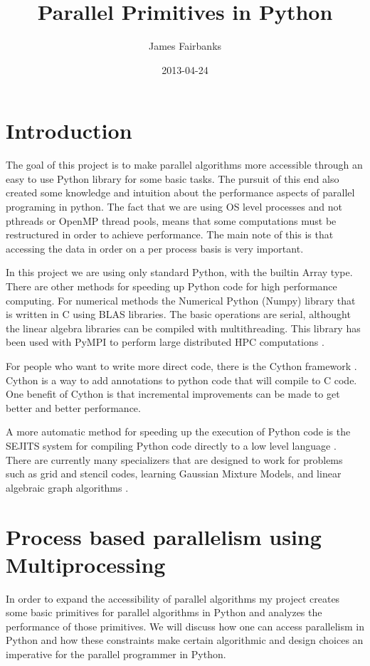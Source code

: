 \documentclass[]{IEEEtran}
\title{Parallel Primitives in Python}
\author{James Fairbanks}
\date{2013-04-24}
\begin{document}
\maketitle

\section{Introduction}

The goal of this project is to make parallel algorithms more accessible
through an easy to use Python library for some basic tasks. The pursuit
of this end also created some knowledge and intuition about the
performance aspects of parallel programing in python. The fact that we
are using OS level processes and not pthreads or OpenMP thread pools,
means that some computations must be restructured in order to achieve
performance. The main note of this is that accessing the data in order
on a per process basis is very important.

In this project we are using only standard Python, with the builtin
Array type. There are other methods for speeding up Python code for high
performance computing. For numerical methods the Numerical Python
(Numpy) library that is written in C using BLAS libraries. The basic
operations are serial, althought the linear algebra libraries can be
compiled with multithreading. This library has been used with PyMPI to
perform large distributed HPC computations \cite{alghamdi2011petclaw}.

For people who want to write more direct code, there is the Cython
framework \cite{cython}. Cython is a way to add annotations to python
code that will compile to C code. One benefit of Cython is that
incremental improvements can be made to get better and better
performance.

A more automatic method for speeding up the execution of Python code is
the SEJITS system for compiling Python code directly to a low level
language \cite{catanzaro2009sejits}. There are currently many specializers that are
designed to work for problems such as grid and stencil codes, learning
Gaussian Mixture Models, and linear algebraic graph algorithms
\cite{sejitsgithub}.

\section{Process based parallelism using Multiprocessing}

In order to expand the accessibility of parallel algorithms my project
creates some basic primitives for parallel algorithms in Python and
analyzes the performance of those primitives. We will discuss how one
can access parallelism in Python and how these constraints make certain
algorithmic and design choices an imperative for the parallel programmer
in Python.
\end{document}
